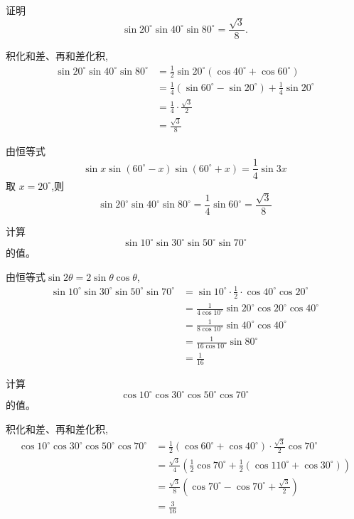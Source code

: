 \begin{questions}
    \question 证明 
    \[
    \sin 20^\circ \sin 40^\circ \sin 80^\circ = \frac{\sqrt{3}}{8}.
    \]
    \begin{solution}
        积化和差、再和差化积,
        \begin{align*}
        \sin 20^\circ \sin 40^\circ \sin 80^\circ
        &= \frac{1}{2} \sin 20^\circ (\cos 40^\circ+\cos 60^\circ) \\
        &= \frac{1}{4}(\sin 60^\circ-\sin 20^\circ)+\frac{1}{4}\sin 20^\circ \\
        &= \frac{1}{4}\cdot\frac{\sqrt{3}}{2} \\
        &= \frac{\sqrt{3}}{8}
        \end{align*}
    \end{solution}
    \begin{solution}
        由恒等式 
        \[
        \sin x \sin(60^\circ-x)\sin(60^\circ+x)=\frac{1}{4}\sin 3x
        \]
        取 $x=20^\circ$,则
        \[
        \sin 20^\circ \sin 40^\circ \sin 80^\circ
        = \frac{1}{4}\sin 60^\circ
        = \frac{\sqrt{3}}{8}
        \]
    \end{solution}

    \question 计算
    \[
    \sin 10^\circ \sin 30^\circ \sin 50^\circ \sin 70^\circ
    \]
    的值。
    \begin{solution}
        由恒等式$\sin2\theta=2\sin\theta\cos\theta$,
        \begin{align*}
        \sin 10^\circ \sin 30^\circ \sin 50^\circ \sin 70^\circ
        &= \sin 10^\circ \cdot \frac{1}{2} \cdot \cos 40^\circ \cos 20^\circ \\
        &= \frac{1}{4\cos 10^\circ} \sin 20^\circ \cos 20^\circ \cos 40^\circ \\
        &= \frac{1}{8\cos 10^\circ} \sin 40^\circ \cos 40^\circ \\
        &= \frac{1}{16\cos 10^\circ} \sin 80^\circ \\
        &= \frac{1}{16}
        \end{align*}
    \end{solution}

    \question 计算
    \[
    \cos 10^\circ \cos 30^\circ \cos 50^\circ \cos 70^\circ
    \]
    的值。
    \begin{solution}
        积化和差、再和差化积,
        \begin{align*}
        \cos 10^\circ \cos 30^\circ \cos 50^\circ \cos 70^\circ
        &= \frac{1}{2}(\cos60^\circ + \cos40^\circ) \cdot \frac{\sqrt{3}}{2} \cos 70^\circ  \\
        &= \frac{\sqrt{3}}{4}\left(\frac{1}{2}\cos 70^\circ+\frac{1}{2}(\cos110^\circ + \cos30^\circ)\right) \\
        &= \frac{\sqrt{3}}{8}(\cos 70^\circ-\cos70^\circ + \frac{\sqrt{3}}{2}) \\
        &= \frac{3}{16}
        \end{align*}
    \end{solution}


\end{questions}
